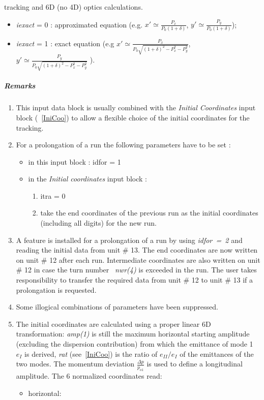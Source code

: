 \begin{description}
  tracking and 6D (no 4D) optics calculations.
  \begin{itemize}
    \item {\em iexact} \/= 0 : approximated equation
              (e.g. $x'\simeq \frac{P_x}{P_0(1+\delta)}$,
                    $y'\simeq \frac{P_y}{P_0(1+\delta)}$);
    \item {\em iexact} \/= 1 : exact equation (e.g
      $x'\simeq \frac{P_x}{P_0\sqrt{(1+\delta)^2-P_x^2-P_y^2}}$,
      $y'\simeq \frac{P_y}{P_0\sqrt{(1+\delta)^2-P_x^2-P_y^2}}$ ).
 \end{itemize}
\end{description}

\subparagraph{Remarks}
\begin{enumerate}
\item This input data block is usually combined with the {\em Initial
    Coordinates} \/input block (~\ref{IniCoo}) to allow a flexible
  choice of the initial coordinates for the tracking.
\item For a prolongation of a run the following parameters have to be
  set :
\begin{itemize}
\item in this input block : idfor = 1
\item in the {\em Initial coordinates} \/input block :
\begin{enumerate}
\item itra = 0
\item take the end coordinates of the previous run as the initial
  coordinates (including all digits) for the new run.
\end{enumerate}
\end{itemize}
\item A feature is installed for a prolongation of a run by using
  \mbox{\em idfor = 2} \/and 
  reading the initial data from unit \# 13. The end coordinates are
  now written on unit \# 12 after each run. Intermediate coordinates
  are also written on unit \# 12 in case the turn number \mbox{\em
    nwr(4)} \/is exceeded in the run. The user takes responsibility to
  transfer the required data from unit \# 12 to unit \# 13 if a
  prolongation is requested.
\item Some illogical combinations of parameters have been suppressed.
\item The initial coordinates are calculated using a proper linear 6D
  transformation: {\em amp(1)} \/is still the maximum horizontal
  starting amplitude (excluding the dispersion contribution) from
  which the emittance of mode 1 $e_I$ is derived, {\em rat}
  \/(see~\ref{IniCoo}) is the ratio of $e_{II}/e_I$ of the emittances
  of the two modes. The momentum deviation $\frac{\Delta p}{p_{o1}}$ is used to
  define a longitudinal amplitude. The 6 normalized coordinates read:
\begin{itemize}
\item horizontal:\\


\end{itemize}
\end{enumerate}
